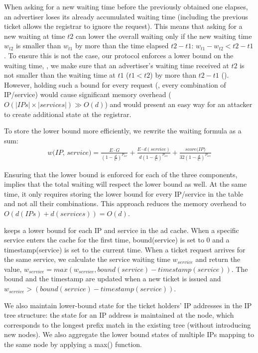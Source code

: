 When asking for a new waiting time before the previously obtained one elapses,
an advertiser loses its already accumulated waiting time (including the previous ticket allows the registrar to ignore the request). This means that asking for a new waiting at time $t2$ can lower the overall waiting only if the new waiting time $w_{t2}$ is smaller than $w_{t1}$ by more than the time elapsed $t2 - t1$: $w_{t1} - w_{t2} < t2 - t1$.
To ensure this is not the case, our protocol enforces a lower bound on the
waiting time, \ie, we make sure that an advertiser's waiting time received at
$t2$ is not smaller than the waiting time at $t1$ ($t1 < t2$) by more than
$t2 - t1$ ().
However, holding such a bound for every request (\ie, every combination of IP/service) would cause significant memory overhead ($O(|\textit{IPs}|\times|\textit{services}|) \gg O(d)$) and would present an easy way for an attacker to create additional state at the registrar. 

To store the lower bound more efficiently, we rewrite the waiting formula as a sum:
\begin{equation}
\begin{split}
    \textit{w(IP, service)} = 
    \frac{E\cdot G}{(1-\frac{d}{C})^{P_\textit{occ}}} + \frac{E\cdot d(\textit{service})}{d(1-\frac{d}{C})^{P_\textit{occ}}} + \frac{\textit{score(IP)}}{32(1-\frac{d}{C})^{P_\textit{occ}}}
\end{split}
\end{equation}


Ensuring that the lower bound is enforced for each of the three components, implies that the total waiting will respect the lower bound as well. At the same time, it only requires storing the lower bound for every IP/service in the table and not all their combinations. This approach reduces the memory overhead to $O(d(IPs)+d(services)) = O(d)$.

\sysname keeps a lower bound for each IP and service in the ad cache. When a specific service enters the cache for the first time, bound(service) is set to 0 and a timestamp(service) is set to the current time. When a ticket request arrives for the same service, we calculate the service waiting time $w_{\textit{service}}$ and return the value, $w_{\textit{service}} = \textit{max}(w_{\textit{service}}, \textit{bound}(\textit{service}) - \textit{timestamp}(\textit{service}))$. The bound and the timestamp are updated when a new ticket is issued and $w_{\textit{service}} > (\textit{bound}(\textit{service}) - \textit{timestamp}(\textit{service}))$. 

We also maintain lower-bound state for the ticket holders' IP addresses in the IP tree structure: the state for an IP address is maintained at the node, which corresponds to the longest prefix match in the existing tree (without introducing new nodes). We also aggregate the lower bound states of multiple IPs mapping to the same node by applying a max() function.  



